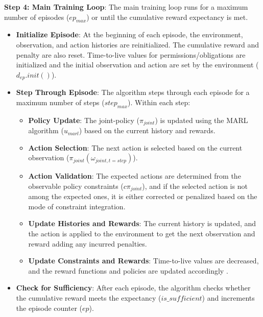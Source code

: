 \documentclass[conference]{IEEEtran}
\begin{document}
\textbf{Step 4: Main Training Loop}: \quad
The main training loop runs for a maximum number of episodes ($ep_{max}$) or until the cumulative reward expectancy is met.

\begin{itemize}
    \item \textbf{Initialize Episode}:
          At the beginning of each episode, the environment, observation, and action histories are reinitialized. The cumulative reward and penalty are also reset. Time-to-live values for permissions/obligations are initialized and the initial observation and action are set by the environment ($d_{ep}.init()$).

    \item \textbf{Step Through Episode}:
          The algorithm steps through each episode for a maximum number of steps ($step_{max}$). Within each step:

          \begin{itemize}
              \item \textbf{Policy Update}:
                    The joint-policy ($\pi_{joint}$) is updated using the MARL algorithm ($u_{marl}$) based on the current history and rewards.

              \item \textbf{Action Selection}:
                    The next action is selected based on the current observation ($\pi_{joint}(\omega_{joint,t=step})$).

              \item \textbf{Action Validation}:
                    The expected actions are determined from the observable policy constraints ($c\pi_{joint}$), and if the selected action is not among the expected ones, it is either corrected or penalized based on the mode of constraint integration.

              \item \textbf{Update Histories and Rewards}:
                    The current history is updated, and the action is applied to the environment to get the next observation and reward adding any incurred penalties.

              \item \textbf{Update Constraints and Rewards}:
                    Time-to-live values are decreased, and the reward functions and policies are updated accordingly .
          \end{itemize}

    \item \textbf{Check for Sufficiency}:
          After each episode, the algorithm checks whether the cumulative reward meets the expectancy ($is\_sufficient$) and increments the episode counter ($ep$).
\end{itemize}
\end{document}
